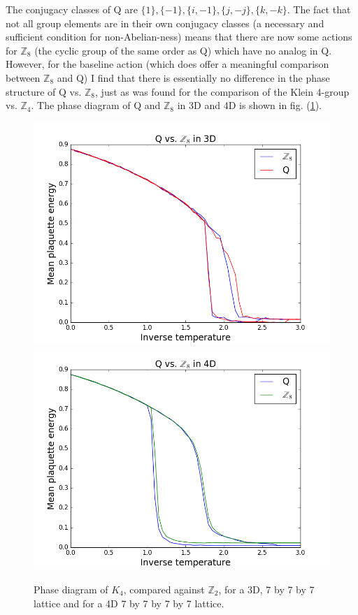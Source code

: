 \documentclass[9pt,twocolumn,twoside]{article}
\begin{document}
The conjugacy classes of Q are $\{1\},\{-1\},\{i,-1\},\{j,-j\},\{k,-k\}$.  The fact that not all group elements are in their own conjugacy classes (a necessary and sufficient condition for non-Abelian-ness) means that there are now some actions for $\mathbb{Z}_8$ (the cyclic group of the same order as Q) which have no analog in Q.  However, for the baseline action (which does offer a meaningful comparison between $\mathbb{Z}_8$ and Q) I find that there is essentially no difference in the phase structure of Q vs. $\mathbb{Z}_8$, just as was found for the comparison of the Klein 4-group vs. $\mathbb{Z}_4$.  The phase diagram of Q and $\mathbb{Z}_8$ in 3D and 4D is shown in fig. (\ref{qvz8}). 

\begin{figure}[h!]
	\begin{centering}
	\includegraphics[width=\columnwidth]{qvz8,3d}
	\includegraphics[width=\columnwidth]{qvz8,4d}
	\caption{Phase diagram of $K_4$, compared against $\mathbb{Z}_2$, for a 3D, 7 by 7 by 7 lattice and for a 4D 7 by 7 by 7 by 7 lattice.}
	\label{qvz8}
	\end{centering}
\end{figure}
\end{document}
